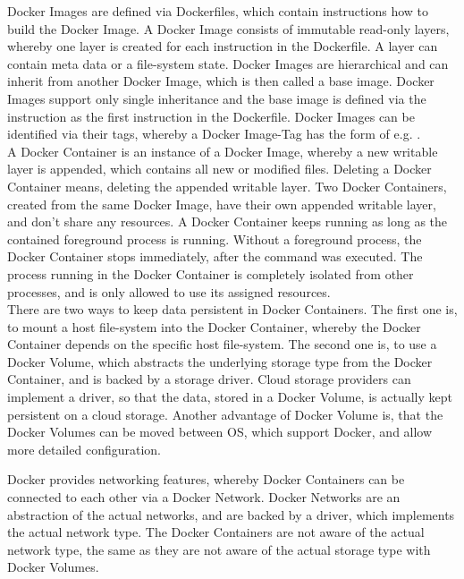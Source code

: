 \label{sec:docker-images}
Docker Images are defined via Dockerfiles, which contain instructions how to build the Docker Image. A Docker Image consists of immutable read-only layers, whereby one layer is created for each instruction in the Dockerfile. A layer can contain meta data or a file-system state. Docker Images are hierarchical and can inherit from another Docker Image, which is then called a base image. Docker Images support only single inheritance and the base image is defined via the  instruction as the first instruction in the Dockerfile. Docker Images can be identified via their tags, whereby a Docker Image-Tag has the form of  e.g. . \\

\label{sec:docker-containers}
A Docker Container is an instance of a Docker Image, whereby a new writable layer is appended, which contains all new or modified files. Deleting a Docker Container means, deleting the appended writable layer. Two Docker Containers, created from the same Docker Image, have their own appended writable layer, and don't share any resources. A Docker Container keeps running as long as the contained foreground process is running. Without a foreground process, the Docker Container stops immediately, after the command was executed. The process running in the Docker Container is completely isolated from other processes, and is only allowed to use its assigned resources. \\

\label{sec:docker-volumes}
There are two ways to keep data persistent in Docker Containers. The first one is, to mount a host file-system into the Docker Container, whereby the Docker Container depends on the specific host file-system. The second one is, to use a Docker Volume, which abstracts the underlying storage type from the Docker Container, and is backed by a storage driver. Cloud storage providers can implement a driver, so that the data, stored in a Docker Volume, is actually kept persistent on a cloud storage. Another advantage of Docker Volume is, that the Docker Volumes can be moved between OS, which support Docker, and allow more detailed configuration.  

\label{sec:docker-network}
Docker provides networking features, whereby Docker Containers can be connected to each other via a Docker Network. Docker Networks are an abstraction of the actual networks, and are backed by a driver, which implements the actual network type. The Docker Containers are not aware of the actual network type, the same as they are not aware of the actual storage type with Docker Volumes.

